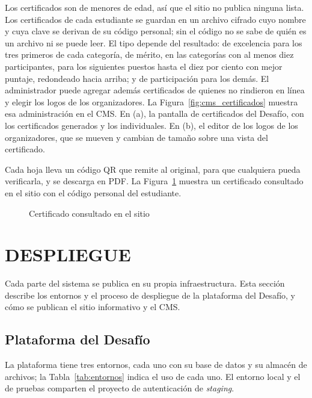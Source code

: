 Los certificados son de menores de edad, así que el sitio no publica ninguna lista. Los certificados de cada estudiante se guardan en un archivo cifrado cuyo nombre y cuya clave se derivan de su código personal; sin el código no se sabe de quién es un archivo ni se puede leer. El tipo depende del resultado: de excelencia para los tres primeros de cada categoría, de mérito, en las categorías con al menos diez participantes, para los siguientes puestos hasta el diez por ciento con mejor puntaje, redondeado hacia arriba; y de participación para los demás. El administrador puede agregar además certificados de quienes no rindieron en línea y elegir los logos de los organizadores. La Figura~\ref{fig:cms_certificados} muestra esa administración en el CMS. En (a), la pantalla de certificados del Desafío, con los certificados generados y los individuales. En (b), el editor de los logos de los organizadores, que se mueven y cambian de tamaño sobre una vista del certificado.


Cada hoja lleva un código QR que remite al original, para que cualquiera pueda verificarla, y se descarga en PDF. La Figura~\ref{fig:cms_certificado_sitio} muestra un certificado consultado en el sitio con el código personal del estudiante.

\begin{figure}[htbp]
\centering
{}
\caption{Certificado consultado en el sitio}
\label{fig:cms_certificado_sitio}
\end{figure}

\section{DESPLIEGUE}

Cada parte del sistema se publica en su propia infraestructura. Esta sección describe los entornos y el proceso de despliegue de la plataforma del Desafío, y cómo se publican el sitio informativo y el CMS.

\subsection{Plataforma del Desafío}

La plataforma tiene tres entornos, cada uno con su base de datos y su almacén de archivos; la Tabla~\ref{tab:entornos} indica el uso de cada uno. El entorno local y el de pruebas comparten el proyecto de autenticación de \textit{staging}.

